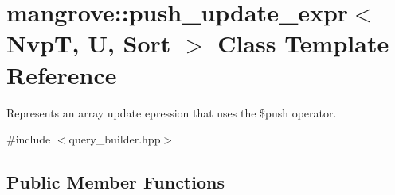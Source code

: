\hypertarget{classmangrove_1_1push__update__expr}{}\section{mangrove\+:\+:push\+\_\+update\+\_\+expr$<$ NvpT, U, Sort $>$ Class Template Reference}
\label{classmangrove_1_1push__update__expr}


Represents an array update epression that uses the \$push operator.  




{\ttfamily \#include $<$query\+\_\+builder.\+hpp$>$}

\subsection*{Public Member Functions}
